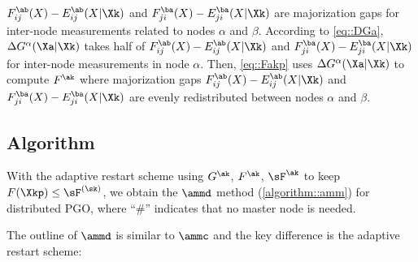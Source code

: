 \begin{remark}
	\highlight
	$F_{ij}^{\ab}(X)-E_{ij}^{\ab}(X|\Xk)$ and $F_{ji}^{\ba}(X)-E_{ji}^{\ba}(X|\Xk)$ are majorization gaps for inter-node measurements related to nodes $\alpha$ and $\beta$.  According to \cref{eq::DGa}, $\Delta G^{\alpha}(\Xa|\Xk)$ takes half of  $F_{ij}^{\ab}(X)-E_{ij}^{\ab}(X|\Xk)$ and $F_{ji}^{\ba}(X)-E_{ji}^{\ba}(X|\Xk)$ for inter-node measurements in node $\alpha$.  Then, \cref{eq::Fakp} uses $\Delta G^\alpha(\Xa|\Xk)$ to compute $F^{\ak}$ where majorization gaps $F_{ij}^{\ab}(X)-E_{ij}^{\ab}(X|\Xk)$ and $F_{ji}^{\ba}(X)-E_{ji}^{\ba}(X|\Xk)$ are evenly redistributed between nodes $\alpha$ and $\beta$. 
\end{remark}




\vspace{-0.5em}
\subsection{Algorithm}\label{section::amm::algorithm}
With the adaptive restart scheme using $G^{\ak}$, $F^{\ak}$, $\sF^{\ak}$ to keep $F(\Xkp)\leq \sF^{(\sk)}$, we obtain the $\ammd$ method (\cref{algorithm::amm}) for distributed PGO, where ``$\#$'' indicates that no master node is needed.

The outline of  $\ammd$  is similar to  $\ammc$  and the key difference is the adaptive restart scheme:

